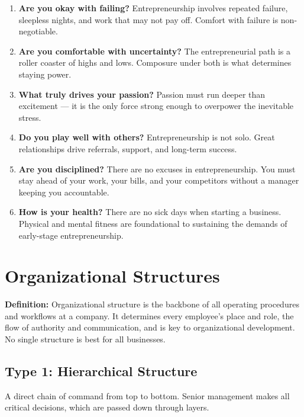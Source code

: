\documentclass[11pt, letterpaper]{article}
\begin{document}
\begin{enumerate}[leftmargin=*, label=\textbf{\arabic*.}]
  \item \textbf{Are you okay with failing?} Entrepreneurship involves repeated failure, sleepless nights, and work that may not pay off. Comfort with failure is non-negotiable.
  \item \textbf{Are you comfortable with uncertainty?} The entrepreneurial path is a roller coaster of highs and lows. Composure under both is what determines staying power.
  \item \textbf{What truly drives your passion?} Passion must run deeper than excitement --- it is the only force strong enough to overpower the inevitable stress.
  \item \textbf{Do you play well with others?} Entrepreneurship is not solo. Great relationships drive referrals, support, and long-term success.
  \item \textbf{Are you disciplined?} There are no excuses in entrepreneurship. You must stay ahead of your work, your bills, and your competitors without a manager keeping you accountable.
  \item \textbf{How is your health?} There are no sick days when starting a business. Physical and mental fitness are foundational to sustaining the demands of early-stage entrepreneurship.
\end{enumerate}

\newpage

\section{Organizational Structures}

\begin{defbox}
\textbf{Definition:} Organizational structure is the backbone of all operating procedures and workflows at a company. It determines every employee's place and role, the flow of authority and communication, and is key to organizational development. No single structure is best for all businesses.
\end{defbox}

\subsection{Type 1: Hierarchical Structure}
A direct chain of command from top to bottom. Senior management makes all critical decisions, which are passed down through layers.
\end{document}
